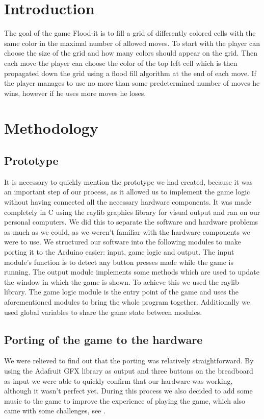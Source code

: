 \documentclass[12pt, a4paper]{article}
\begin{document}
\section*{Introduction}

The goal of the game Flood-it is to fill a grid of differently colored cells with the same color in the maximal number of allowed moves. To start with the player can choose the size of the grid and how many colors should appear on the grid. Then each move the player can choose the color of the top left cell which is then propagated down the grid using a flood fill algorithm at the end of each move. If the player manages to use no more than some predetermined number of moves he wins, however if he uses more moves he loses.

\section*{Methodology}

\subsection*{Prototype}

It is necessary to quickly mention the prototype we had created, because it was an important step of our process, as it allowed us to implement the game logic without having connected all the necessary hardware components. It was made completely in C using the raylib graphics library for visual output and ran on our personal computers. We did this to separate the software and hardware problems as much as we could, as we weren't familiar with the hardware components we were to use. We structured our software into the following modules to make porting it to the Arduino easier: input, game logic and output. The input module's function is to detect any button presses made while the game is running. The output module implements some methods which are used to update the window in which the game is shown. To achieve this we used the raylib library. The game logic module is the entry point of the game and uses the aforementioned modules to bring the whole program together. Additionally we used global variables to share the game state between modules.


\subsection*{Porting of the game to the hardware}
We were relieved to find out that the porting was relatively straightforward. By using the Adafruit GFX library as output and three buttons on the breadboard as input we were able to quickly confirm that our hardware was working, although it wasn't perfect yet. During this process we also decided to add some music to the game to improve the experience of playing the game, which also came with some challenges, see .
\end{document}
